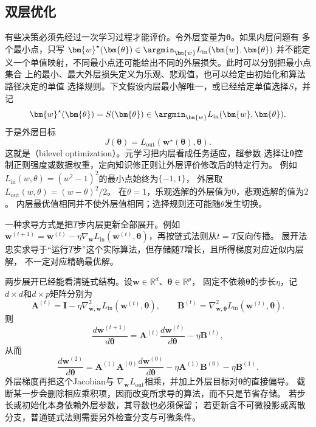 \subsection{双层优化}
\label{sec:opt-bilevel}

有些决策必须先经过一次学习过程才能评价。令外层变量为$\bm{\theta}$。如果内层问题有
多个最小点，只写
$\bm{w}^{\star}(\bm{\theta})\in
\argmin_{\bm{w}}L_{\mathrm{in}}(\bm{w},\bm{\theta})$
并不能定义一个单值映射，不同最小点还可能给出不同的外层损失。此时可以分别把最小点集合
上的最小、最大外层损失定义为乐观、悲观值，也可以给定由初始化和算法路径决定的单值
选择规则。下文假设内层最小解唯一，或已经给定单值选择$S$，并记
\[
  \bm{w}^{\star}(\bm{\theta})=S(\bm{\theta})
  \in\argmin_{\bm{w}}L_{\mathrm{in}}(\bm{w},\bm{\theta}).
\]
于是外层目标
\begin{equation}
  J(\bm{\theta})
  =L_{\mathrm{out}}(\bm{w}^{\star}(\bm{\theta}),\bm{\theta}).
  \label{eq:opt-bilevel-objective}
\end{equation}
这就是（bilevel optimization）。元学习把内层看成任务适应，超参数
选择让$\bm{\theta}$控制正则强度或数据权重，定向知识修正则让外层评价修改后的特定行为。
例如$L_{\mathrm{in}}(w,\theta)=(w^2-1)^2$的最小点始终为$\{-1,1\}$，
外层取$L_{\mathrm{out}}(w,\theta)=(w-\theta)^2/2$。
在$\theta=1$，乐观选解的外层值为$0$，悲观选解的值为$2$。
内层最优值相同并不使外层值相同；选择规则还可能随$\theta$发生切换。

一种求导方式是把$T$步内层更新全部展开。例如
$\bm{w}^{(t+1)}=\bm{w}^{(t)}-\eta\nabla_{\bm{w}}
L_{\mathrm{in}}(\bm{w}^{(t)},\bm{\theta})$，再按链式法则从$t=T$反向传播。
展开法忠实求导于“运行$T$步”这个实际算法，但存储随$T$增长，且所得梯度对应近似内层解，
不一定对应精确最优解。

两步展开已经能看清链式结构。设$\bm w\in\mathbb R^d$、$\bm\theta\in\mathbb R^p$，
固定不依赖$\bm\theta$的步长$\eta$，记$d\times d$和$d\times p$矩阵分别为
\[
  \bm{A}^{(t)}=\bm{I}-\eta\nabla_{\bm{w},\bm{w}}^2
  L_{\mathrm{in}}(\bm{w}^{(t)},\bm{\theta}),\qquad
  \bm{B}^{(t)}=\nabla_{\bm{w},\bm{\theta}}^2
  L_{\mathrm{in}}(\bm{w}^{(t)},\bm{\theta}).
\]
则
\[
  \frac{d\bm{w}^{(t+1)}}{d\bm{\theta}}
  =\bm{A}^{(t)}\frac{d\bm{w}^{(t)}}{d\bm{\theta}}-\eta\bm{B}^{(t)},
\]
从而
\[
  \frac{d\bm{w}^{(2)}}{d\bm{\theta}}
  =\bm{A}^{(1)}\bm{A}^{(0)}\frac{d\bm{w}^{(0)}}{d\bm{\theta}}
  -\eta\bm{A}^{(1)}\bm{B}^{(0)}-\eta\bm{B}^{(1)}.
\]
外层梯度再把这个Jacobian与
$\nabla_{\bm{w}}L_{\mathrm{out}}$相乘，并加上外层目标对$\bm{\theta}$的直接偏导。
截断某一步会删除相应乘积项，因而改变所求导的算法，而不只是节省存储。
若步长或初始化本身依赖外层参数，其导数也必须保留；
若更新含不可微投影或离散分支，普通链式法则需要另外检查分支与可微条件。

